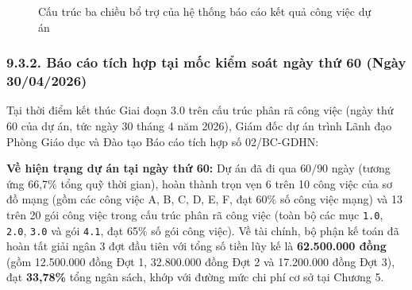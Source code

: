 \begin{figure}[htbp]
\centering
{}
\caption{Cấu trúc ba chiều bổ trợ của hệ thống báo cáo kết quả công việc dự án}
\label{fig:he_thong_bao_cao}
\end{figure}

\subsubsection{9.3.2. Báo cáo tích hợp tại mốc kiểm soát ngày thứ 60 (Ngày 30/04/2026)}

Tại thời điểm kết thúc Giai đoạn 3.0 trên cấu trúc phân rã công việc (ngày thứ 60 của dự án, tức ngày 30 tháng 4 năm 2026), Giám đốc dự án trình Lãnh đạo Phòng Giáo dục và Đào tạo Báo cáo tích hợp số 02/BC-GDHN:

\textbf{Về hiện trạng dự án tại ngày thứ 60:} Dự án đã đi qua $60/90$ ngày (tương ứng 66,7\% tổng quỹ thời gian), hoàn thành trọn vẹn 6 trên 10 công việc của sơ đồ mạng (gồm các công việc A, B, C, D, E, F, đạt 60\% số công việc mạng) và 13 trên 20 gói công việc trong cấu trúc phân rã công việc (toàn bộ các mục \texttt{1.0}, \texttt{2.0}, \texttt{3.0} và gói \texttt{4.1}, đạt 65\% số gói công việc). Về tài chính, bộ phận kế toán đã hoàn tất giải ngân 3 đợt đầu tiên với tổng số tiền lũy kế là \textbf{62.500.000 đồng} (gồm 12.500.000 đồng Đợt 1, 32.800.000 đồng Đợt 2 và 17.200.000 đồng Đợt 3), đạt \textbf{33,78\%} tổng ngân sách, khớp với đường mức chi phí cơ sở tại Chương 5.

